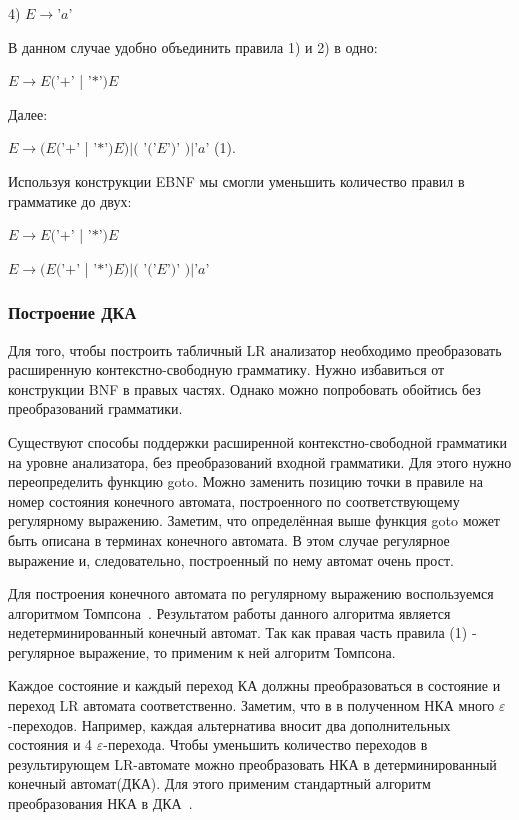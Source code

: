 \hspace{0,9cm} 4) $E \rightarrow $'$a$' 


В данном случае удобно объединить правила 1) и 2) в одно:

\hspace{0,9cm} $E \rightarrow E ($'$+$' | '$*$'$) E$
 
Далее:
  
\hspace{0,9cm} $E \rightarrow (E ($'$+$' | '$*$'$) E) | ($ '$($'$E$'$)$' $) | $'$a$'                                      (1).

Используя конструкции EBNF мы смогли уменьшить количество правил в грамматике  до двух:

\hspace{0,9cm} $E \rightarrow E ($'$+$' | '$*$'$) E$
  
\hspace{0,9cm} $E \rightarrow (E ($'$+$' | '$*$'$) E) | ($ '$($'$E$'$)$' $) | $'$a$'


\subsubsection{Построение ДКА}

Для того, чтобы построить табличный LR анализатор необходимо преобразовать расширенную  контекстно-свободную грамматику. Нужно избавиться от конструкции BNF в правых частях. Однако можно попробовать обойтись без преобразований грамматики.

Существуют способы поддержки расширенной контекстно-свободной грамматики на уровне анализатора, без преобразований входной грамматики. Для этого нужно переопределить функцию goto. Можно заменить позицию точки в правиле на номер состояния конечного автомата, построенного по соответствующему регулярному выражению. Заметим, что определённая выше функция goto может быть описана в терминах конечного автомата. В этом случае регулярное выражение и, следовательно, построенный по нему автомат очень прост.  

Для построения конечного автомата по регулярному выражению воспользуемся алгоритмом Томпсона~\cite{DrgBook}. Результатом работы данного алгоритма является недетерминированный конечный автомат. Так как правая часть правила (1) - регулярное выражение, то применим к ней алгоритм Томпсона.%

Каждое состояние и каждый переход КА должны преобразоваться в состояние и переход LR автомата соответственно. Заметим, что в в полученном НКА много $\varepsilon$-переходов. Например, каждая альтернатива вносит два дополнительных состояния и 4 $\varepsilon$-перехода. Чтобы уменьшить количество переходов в результирующем LR-автомате можно преобразовать НКА в детерминированный конечный автомат(ДКА). Для этого применим стандартный алгоритм преобразования НКА в ДКА~\cite{DrgBook}. %


